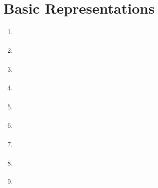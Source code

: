\documentclass[letterpaper,10pt,english]{jupyterBook}
\begin{document}
\chapter{Basic Representations}
\label{\detokenize{Representations/Representations:basic-representations}}\label{\detokenize{Representations/Representations::doc}}\begin{enumerate}
%
\item {} 
\sphinxAtStartPar
{\hyperref[\detokenize{Representations/Waveform::doc}]{}} 

\item {} 
\sphinxAtStartPar
{\hyperref[\detokenize{Representations/Short-time_analysis::doc}]{}}

\item {} 
\sphinxAtStartPar
{\hyperref[\detokenize{Representations/Short-time_processing::doc}]{}}

\item {} 
\sphinxAtStartPar
{\hyperref[\detokenize{Representations/Windowing::doc}]{}}

\item {} 
\sphinxAtStartPar
{\hyperref[\detokenize{Representations/Signal_energy_loudness_and_decibel::doc}]{}}

\item {} 
\sphinxAtStartPar
{\hyperref[\detokenize{Representations/Spectrogram_and_the_STFT::doc}]{}}

\item {} 
\sphinxAtStartPar
{\hyperref[\detokenize{Representations/Autocorrelation_and_autocovariance::doc}]{}}

\item {} 
\sphinxAtStartPar
{\hyperref[\detokenize{Representations/Melcepstrum::doc}]{}}

\item {} 
\sphinxAtStartPar
{\hyperref[\detokenize{Representations/Linear_prediction::doc}]{}}


\end{enumerate}
\end{document}

